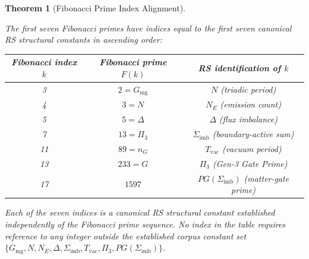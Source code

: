 \documentclass[11pt, letterpaper]{article}
\theoremstyle{definition}
\theoremstyle{plain}
\newtheorem{theorem}{Theorem}[section]
\begin{document}
\begin{theorem}[Fibonacci Prime Index Alignment]
\begin{rsbox}
The first seven Fibonacci primes have indices equal to the first seven canonical RS
structural constants in ascending order:

\begin{center}
\begin{tabular}{ccc}
\hline
Fibonacci index $k$ & Fibonacci prime $F(k)$ & RS identification of $k$ \\
\hline
3  & $2 = G_{\mathrm{mg}}$   & $N$ (triadic period) \\
4  & $3 = N$                 & $N_E$ (emission count) \\
5  & $5 = \Delta$            & $\Delta$ (flux imbalance) \\
7  & $13 = \Pi_3$            & $\Sigma_{\mathrm{imb}}$ (boundary-active sum) \\
11 & $89 = n_G$              & $T_{\mathrm{vac}}$ (vacuum period) \\
13 & $233 = G$               & $\Pi_3$ (Gen-3 Gate Prime) \\
17 & $1597$                  & $PG(\Sigma_{\mathrm{imb}})$ (matter-gate prime) \\
\hline
\end{tabular}
\end{center}

Each of the seven indices is a canonical RS structural constant established independently
of the Fibonacci prime sequence. No index in the table requires reference to any integer
outside the established corpus constant set
$\{G_{\mathrm{mg}}, N, N_E, \Delta, \Sigma_{\mathrm{imb}}, T_{\mathrm{vac}}, \Pi_3,
PG(\Sigma_{\mathrm{imb}})\}$.
\end{rsbox}
\end{theorem}
\end{document}
